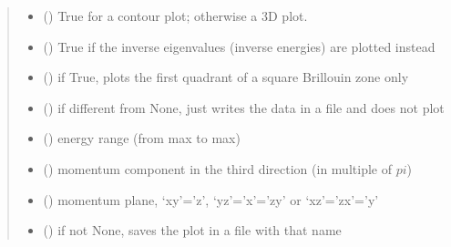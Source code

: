 \documentclass[letterpaper,10pt,english]{sphinxmanual}
\begin{document}
\begin{fulllineitems}
\begin{quote}
\begin{description}
\begin{itemize}
\item {} 
\sphinxAtStartPar
{} () \textendash{} True for a contour plot; otherwise a 3D plot.

\item {} 
\sphinxAtStartPar
{} () \textendash{} True if the inverse eigenvalues (inverse energies) are plotted instead

\item {} 
\sphinxAtStartPar
{} () \textendash{} if True, plots the first quadrant of a square Brillouin zone only

\item {} 
\sphinxAtStartPar
{} () \textendash{} if different from None, just writes the data in a file and does not plot

\item {} 
\sphinxAtStartPar
{} () \textendash{} energy range (from \sphinxhyphen{}max to max)

\item {} 
\sphinxAtStartPar
{} () \textendash{} momentum component in the third direction (in multiple of \(pi\))

\item {} 
\sphinxAtStartPar
{} () \textendash{} momentum plane, ‘xy’=’z’, ‘yz’=’x’=’zy’ or ‘xz’=’zx’=’y’

\item {} 
\sphinxAtStartPar
{} () \textendash{} if not None, saves the plot in a file with that name


\end{itemize}
\end{description}
\end{quote}
\end{fulllineitems}
\end{document}

